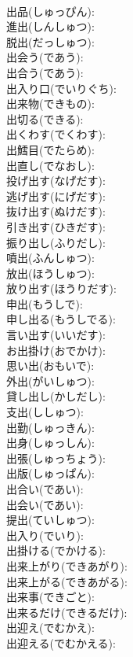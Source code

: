 \documentclass[8pt]{extreport}
\begin{document}
\begin{CJK}{UTF8}{min}
\\	出品(しゅっぴん): 
\\	進出(しんしゅつ): 
\\	脱出(だっしゅつ): 
\\	出会う(であう): 
\\	出合う(であう): 
\\	出入り口(でいりぐち): 
\\	出来物(できもの): 
\\	出切る(できる): 
\\	出くわす(でくわす): 
\\	出鱈目(でたらめ): 
\\	出直し(でなおし): 
\\	投げ出す(なげだす): 
\\	逃げ出す(にげだす): 
\\	抜け出す(ぬけだす): 
\\	引き出す(ひきだす): 
\\	振り出し(ふりだし): 
\\	噴出(ふんしゅつ): 
\\	放出(ほうしゅつ): 
\\	放り出す(ほうりだす): 
\\	申出(もうしで): 
\\	申し出る(もうしでる): 
\\	言い出す(いいだす): 
\\	お出掛け(おでかけ): 
\\	思い出(おもいで): 
\\	外出(がいしゅつ): 
\\	貸し出し(かしだし): 
\\	支出(ししゅつ): 
\\	出勤(しゅっきん): 
\\	出身(しゅっしん): 
\\	出張(しゅっちょう): 
\\	出版(しゅっぱん): 
\\	出合い(であい): 
\\	出会い(であい): 
\\	提出(ていしゅつ): 
\\	出入り(でいり): 
\\	出掛ける(でかける): 
\\	出来上がり(できあがり): 
\\	出来上がる(できあがる): 
\\	出来事(できごと): 
\\	出来るだけ(できるだけ): 
\\	出迎え(でむかえ): 
\\	出迎える(でむかえる): 

\end{CJK}
\end{document}
